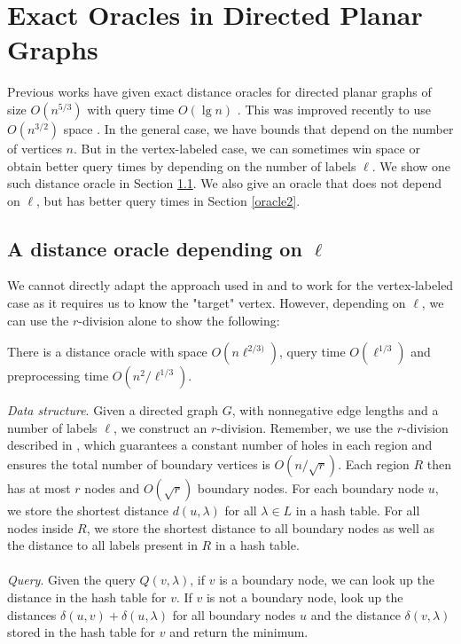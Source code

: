 \section{Exact Oracles in Directed Planar Graphs}\label{exactPlanar}
Previous works have given exact distance oracles for directed planar graphs of size
$O(n^{5/3})$ with query time $O(\lg n)$ \cite{cohen2017fast}. This was improved recently
to use $O(n^{3/2})$ space \cite{gawrychowski2017better}. In the general case, we have
bounds that depend on the number of vertices $n$. But in the vertex-labeled case, we can
sometimes win space or obtain better query times by depending on the number of labels
$\ell$. We show one such distance oracle in Section \ref{oracle1}. We also give an oracle
that does not depend on $\ell$, but has better query times in Section \ref{oracle2}.

\subsection{A distance oracle depending on $\ell$}\label{oracle1}
We cannot directly adapt the approach used in \cite{cohen2017fast} and \cite{gawrychowski2017better} to work
for the vertex-labeled case as it requires us to know the "target" vertex. However,
depending on $\ell$, we can use the $r$-division alone to show the following:
\begin{thm}\label{thm1}
  There is a distance oracle with space $O(n\ell^{2/3)})$, query time $O(\ell^{1/3})$ and
  preprocessing time $O(n^2/\ell^{1/3})$.
\end{thm}
\textit{Data structure}. Given a directed graph $G$, with nonnegative edge lengths and a number of labels $\ell$, we
construct an $r$-division. Remember, we use the $r$-division described in
\cite{klein2013structured}, which guarantees a constant number of holes in each region
and ensures the total number of boundary vertices is $O(n/\sqrt{r})$. Each region $R$ then has at most $r$ nodes and $O(\sqrt{r})$
boundary nodes. For each boundary node $u$, we store the shortest distance $d(u,\lambda)$
for all $\lambda \in L$ in a hash table. For all nodes inside $R$, we store the shortest
distance to all
boundary nodes as well as the distance to all labels present in $R$ in a hash table. \\
\\
\indent \textit{Query}. Given the query $Q(v, \lambda)$, if $v$ is a boundary node, we can look
up the distance in the hash table for $v$. If $v$ is not a boundary node, look up the
distances $\delta(u,v)+\delta(u,\lambda)$ for all boundary nodes $u$ and the distance
$\delta(v,\lambda)$ stored in the hash table for $v$ and return the minimum.

